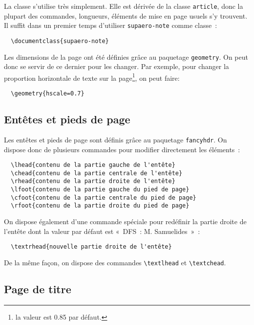 \documentclass{supaero-note}
\begin{document}
La classe s'utilise très simplement. Elle est dérivée de la classe
\texttt{article}, donc la plupart des commandes, longueurs, éléments
de mise en page usuels s'y trouvent. Il suffit dans un premier temps
d'utiliser \texttt{supaero-note} comme classe~:

\begin{verbatim}
  \documentclass{supaero-note}
\end{verbatim}

Les dimensions de la page ont été définies grâce au paquetage
\texttt{geometry}. On peut donc se servir de ce dernier pour les
changer. Par exemple, pour changer la proportion horizontale de texte
sur la page\footnote{la valeur est 0.85 par défaut.}, on peut faire:

\begin{verbatim}
  \geometry{hscale=0.7}
\end{verbatim}

\subsection{Entêtes et pieds de page}
\label{sec:entetes-et-pieds}

Les entêtes et pieds de page sont définis grâce au paquetage
\texttt{fancyhdr}. On dispose donc de plusieurs commandes pour
modifier directement les éléments~:

\begin{verbatim}
  \lhead{contenu de la partie gauche de l'entête}
  \chead{contenu de la partie centrale de l'entête}
  \rhead{contenu de la partie droite de l'entête}
  \lfoot{contenu de la partie gauche du pied de page}
  \cfoot{contenu de la partie centrale du pied de page}
  \rfoot{contenu de la partie droite du pied de page}
\end{verbatim}

On dispose également d'une commande spéciale pour redéfinir la partie
droite de l'entête dont la valeur par défaut est «~DFS~:
M. Samuelides~»~:

\begin{verbatim}
  \textrhead{nouvelle partie droite de l'entête}
\end{verbatim}

De la même façon, on dispose des commandes \verb!\textlhead! et
\verb!\textchead!.

\subsection{Page de titre}
\label{sec:page-de-titre}
\end{document}
